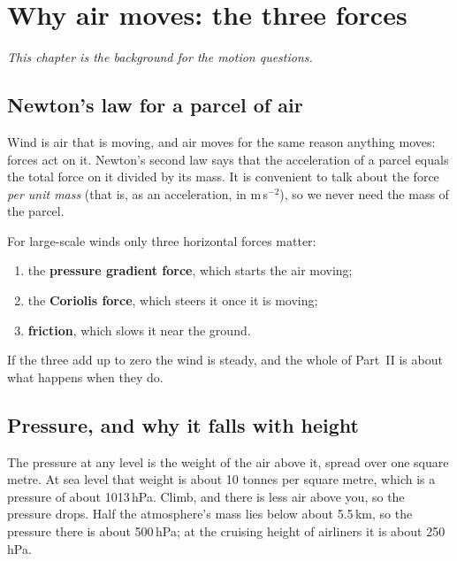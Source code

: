 \chapter{Why air moves: the three forces}\label{p3-ch:forces}

\textit{This chapter is the background for the motion questions.}

\section{Newton's law for a parcel of air}

Wind is air that is moving, and air moves for the same reason anything moves: forces act on it. Newton's second law says that the acceleration of a parcel equals the total force on it divided by its mass. It is convenient to talk about the force \emph{per unit mass} (that is, as an acceleration, in m\,s$^{-2}$), so we never need the mass of the parcel.

For large-scale winds only three horizontal forces matter:
\begin{enumerate}[label=\textbf{\arabic*.},itemsep=2pt]
\item the \textbf{pressure gradient force}, which starts the air moving;
\item the \textbf{Coriolis force}, which steers it once it is moving;
\item \textbf{friction}, which slows it near the ground.
\end{enumerate}
If the three add up to zero the wind is steady, and the whole of Part~II is about what happens when they do.

\section{Pressure, and why it falls with height}

The pressure at any level is the weight of the air above it, spread over one square metre. At sea level that weight is about 10 tonnes per square metre, which is a pressure of about 1013\,hPa. Climb, and there is less air above you, so the pressure drops. Half the atmosphere's mass lies below about 5.5\,km, so the pressure there is about 500\,hPa; at the cruising height of airliners it is about 250\,hPa.

